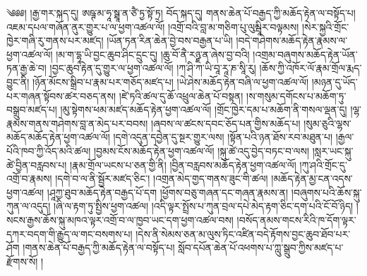 \setcounter{footnote}{0} 
༄༅༅། །རྒྱ་གར་སྐད་དུ། ཨཥྚ་མ་ཧཱ་སྠཱ་ན་ཙཻ་ཏྱ་སྟོ་ཏྲ། བོད་སྐད་དུ། གནས་ཆེན་པོ་བརྒྱད་ཀྱི་མཆོད་རྟེན་ལ་བསྟོད་པ། འཇམ་དཔལ་གཞོན་ནུར་གྱུར་པ་ལ་ཕྱག་འཚལ་ལོ། །འགྲོ་བའི་བླ་མ་གཅིག་པུ་ལུམྦཱིར་བལྟམས། །སེར་སྐྱའི་གྲོང་ཁྱེར་གཞི་རུ་གནས་པར་མཛད། །ཡོན་ཏན་རིན་ཆེན་བྱེ་བས་བརྒྱན་པ་ཡི། །བདེ་གཤེགས་མཆོད་རྟེན་རྣམས་ལ་ཕྱག་འཚལ་ལོ། །མ་ག་དྷཱ་ཡི་བྱང་ཆུབ་ཤིང་དྲུང་དུ། །ཆུ་བོ་ནཻ་རཉྫ་ན་ཞེས་བྱ་བའི། །འགྲམ་བཞུགས་མཆོད་རྟེན་ཡོན་ཏན་རྒྱ་ཆེ་བ། །བྱང་ཆུབ་རྟེན་དུ་གྱུར་ལ་ཕྱག་འཚལ་ལོ། །ཀ་ཤི་ཀ་ཡི་བཱ་རཱ་ཎ་སཱི་རུ། །ཆོས་ཀྱི་འཁོར་ལོ་རྣམ་གྲོལ་རྨད་བྱུང་ནི། །ཉོན་མོངས་སྒྲིབ་པ་རྣམ་པར་གཅོད་མཛད་པ། །ཡེ་ཤེས་མཆོད་རྟེན་བཞི་ལ་ཕྱག་འཚལ་ལོ། །མཉན་དུ་ཡོད་པར་གཞན་སྟོབས་ཚར་བཅད་ནས། །ཛེ་ཏའི་ཚལ་དུ་ཆོ་འཕྲུལ་ཆེན་པོ་བསྟན། །ས་གསུམ་དགོངས་པ་མཆོག་ཏུ་བསྒྲུབ་མཛད་པ། །མུ་སྟེགས་ཕམ་མཛད་མཆོད་རྟེན་ཕྱག་འཚལ་ལོ། །གྲོང་ཁྱེར་དམ་པ་མཆོག་ནི་གསལ་ལྡན་དུ། །ལྷ་རྣམས་གནས་གཤེགས་བླ་ན་མེད་པར་བབས། །ཞབས་ལ་ཚངས་དབང་ཅོད་པན་གྱིས་མཆོད་པ། །སུམ་ཅུའི་ལྷས་མཆོད་མཆོད་རྟེན་ཕྱག་འཚལ་ལོ། །དགེ་འདུན་དབྱེན་དུ་སྔར་གྱུར་ལས། །སྟོན་པའི་ཉན་ཐོས་རབ་མཐུན་པ། །རྒྱལ་པོའི་ཁབ་ཀྱི་འོད་མའི་ཚལ། །བྱམས་ངོས་མཆོད་རྟེན་ཕྱག་འཚལ་ལོ། །སྐུ་ཚེ་འདུ་བྱེད་བཏང་བ་ལས། །སླར་ཡང་སྐུ་ཚེ་བྱིན་བརླབས་པ། །རྣམ་གྲོལ་ཡངས་པ་ཅན་གྱི་ནི། །བྱིན་བརླབས་མཆོད་རྟེན་ཕྱག་འཚལ་ལོ། །ཀུ་ཤའི་གྲོང་དུ་འགྲོ་བ་རྣམས། །དགེ་བ་ལ་ནི་སྦྱོར་མཛད་ཅིང་། །འགྲན་མེད་གྱད་གནས་ཟུང་གི་ཚལ། །མཆོད་རྟེན་མྱ་ངན་འདས་ཕྱག་འཚལ། །ཤཱཀྱ་ཐུབ་མཆོད་རྟེན་བརྒྱད་པོ་དག །ཕྱོགས་བཅུ་གཞན་དང་གཞན་རྣམས་ན། །བཞུགས་པའི་ཆོས་སྐུ་ཀུན་ལ་འདུད། །ཞི་ལ་རྟག་ཏུ་སྤྱིས་ཕྱག་འཚལ། །འདི་ལྟར་སྤྲོས་པ་ཀུན་བྲལ་དཔེ་མེད་རྟག་ཅིང་དག་པའི་ངོ་བོ་ཉིད། །སངས་རྒྱས་ཆོས་སྐུ་མཁའ་ལྟར་འགྲོ་བ་ལ་ཁྱབ་ཡང་དག་ཕྱག་འཚལ་བས། །བསོད་ནམས་གངས་རིའི་ཁ་དོག་ལྟར་དཀར་བདག་གི་རྒྱུད་ལ་གང་བསགས་པ། །དེས་ནི་སེམས་ཅན་མ་ལུས་ཏིང་འཛིན་བདེ་རྟོགས་བྱང་ཆུབ་ཐོབ་པར་ཤོག །གནས་ཆེན་པོ་བརྒྱད་ཀྱི་མཆོད་རྟེན་ལ་བསྟོད་པ། སློབ་དཔོན་ཆེན་པོ་འཕགས་པ་ཀླུ་སྒྲུབ་ཀྱིས་མཛད་པ་རྫོགས་སོ། །